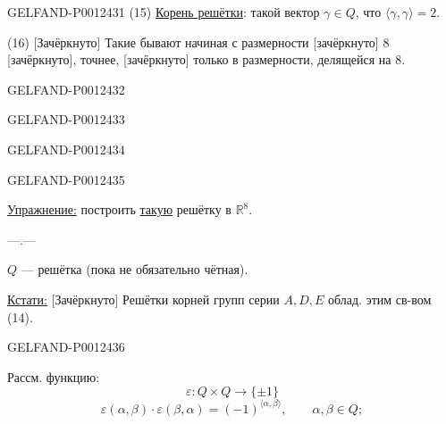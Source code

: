 \begin{GelfandAdjacentEvidence}{GELFAND-P001243}{1}
(15) \underline{Корень решётки}: такой вектор $\gamma\in Q$, что $\langle\gamma,\gamma\rangle=2$.

(16) [Зачёркнуто] Такие бывают начиная с размерности [зачёркнуто] $8$ [зачёркнуто], точнее,
[зачёркнуто] только в размерности, делящейся на $8$.
\end{GelfandAdjacentEvidence}
\begin{GelfandAdjacentEvidence}{GELFAND-P001243}{2}

\end{GelfandAdjacentEvidence}
\begin{GelfandAdjacentEvidence}{GELFAND-P001243}{3}

\end{GelfandAdjacentEvidence}
\begin{GelfandAdjacentEvidence}{GELFAND-P001243}{4}

\end{GelfandAdjacentEvidence}
\begin{GelfandAdjacentEvidence}{GELFAND-P001243}{5}


\underline{Упражнение:} построить \underline{такую} решётку в $\mathbb R^8$.

\begin{center}—\quad .\quad —\end{center}

$Q$ — решётка (пока не обязательно чётная).

\underline{Кстати:} [Зачёркнуто] Решётки корней групп серии $A,D,E$ облад. этим св-вом (14).
\end{GelfandAdjacentEvidence}
\begin{GelfandAdjacentEvidence}{GELFAND-P001243}{6}


Рассм. функцию:
\begin{equation*}
\varepsilon:Q\times Q\longrightarrow\{\pm1\}\tag{17}
\end{equation*}
\begin{equation*}
\varepsilon(\alpha,\beta)\cdot\varepsilon(\beta,\alpha)=(-1)^{\langle\alpha,\beta\rangle},
\qquad\alpha,\beta\in Q;\tag{18}
\end{equation*}
\end{GelfandAdjacentEvidence}
